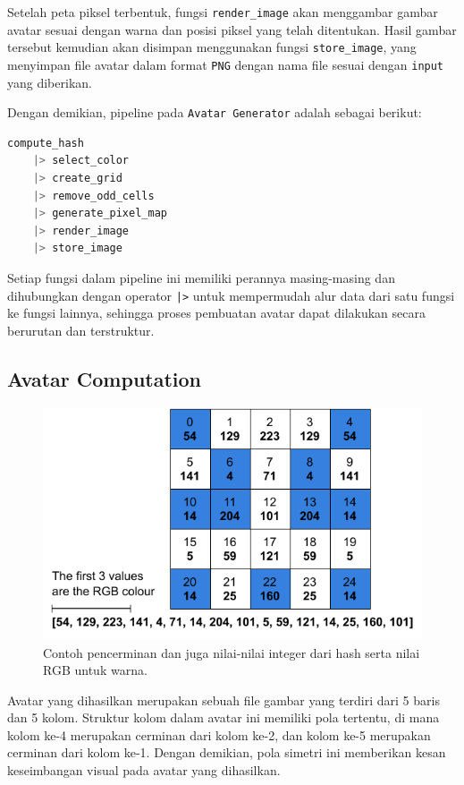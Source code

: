 Setelah peta piksel terbentuk, fungsi \texttt{render\_image} akan menggambar gambar avatar sesuai dengan warna dan posisi piksel yang telah ditentukan. Hasil gambar tersebut kemudian akan disimpan menggunakan fungsi \texttt{store\_image}, yang menyimpan file avatar dalam format \texttt{PNG} dengan nama file sesuai dengan \texttt{input} yang diberikan.

Dengan demikian, pipeline pada \texttt{Avatar Generator} adalah sebagai berikut:

\begin{lstlisting}[language=Elixir]
	compute_hash
	|> select_color
	|> create_grid
	|> remove_odd_cells
	|> generate_pixel_map
	|> render_image
	|> store_image
\end{lstlisting}

Setiap fungsi dalam pipeline ini memiliki perannya masing-masing dan dihubungkan dengan operator \texttt{|>} untuk mempermudah alur data dari satu fungsi ke fungsi lainnya, sehingga proses pembuatan avatar dapat dilakukan secara berurutan dan terstruktur.

\subsection{Avatar Computation}
\begin{figure}
	\begin{center}		\includegraphics[width=1\textwidth]{../assets/avatar-computation.pdf}
	\end{center}
\caption{Contoh pencerminan dan juga nilai-nilai integer dari hash serta nilai RGB untuk warna.}
\end{figure}

Avatar yang dihasilkan merupakan sebuah file gambar yang terdiri dari 5 baris dan 5 kolom. Struktur kolom dalam avatar ini memiliki pola tertentu, di mana kolom ke-4 merupakan cerminan dari kolom ke-2, dan kolom ke-5 merupakan cerminan dari kolom ke-1. Dengan demikian, pola simetri ini memberikan kesan keseimbangan visual pada avatar yang dihasilkan.

